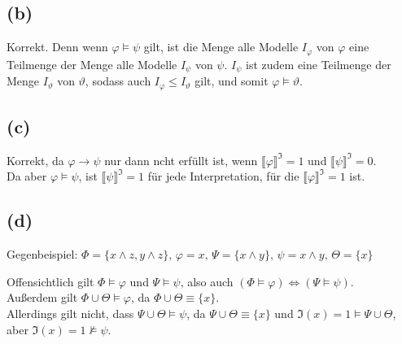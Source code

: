 \documentclass[11pt, a4paper]{article}
\newcommand{\n}{\wedge}
\newcommand{\nmodels}{\nvDash}
\begin{document}
\subsection*{(b)}
Korrekt. Denn wenn $\varphi \models \psi$ gilt, ist die Menge alle Modelle $I_\varphi$ von $\varphi$ eine Teilmenge der Menge alle Modelle $I_\psi$ von $\psi$.
$I_\psi$ ist zudem eine Teilmenge der Menge $I_\vartheta$ von $\vartheta$, sodass auch $I_\varphi \leq I_\vartheta$ gilt, und somit $\varphi \models \vartheta$.

\subsection*{(c)}
Korrekt, da $\varphi \rightarrow \psi$ nur dann ncht erfüllt ist, wenn $\llbracket \varphi \rrbracket^{\mathfrak{I}}=1$ und $\llbracket \psi \rrbracket^{\mathfrak{I}}=0$.\\
Da aber $\varphi \models \psi$, ist $\llbracket \psi \rrbracket^{\mathfrak{I}}=1$ für jede Interpretation, für die $\llbracket \varphi \rrbracket^{\mathfrak{I}}=1$ ist.

\subsection*{(d)}
Gegenbeispiel:
$\Phi = \{ x \n z, y \n z \},\, \varphi = x,\, \Psi = \{ x \n y \},\, \psi = x \n y,\, \Theta = \{ x \}$

Offensichtlich gilt $\Phi \models \varphi$ und $\Psi \models \psi$, also auch $(\Phi \models \varphi) \iff (\Psi \models \psi)$.\\
Außerdem gilt $\Phi \cup \Theta \models \varphi$, da $\Phi \cup \Theta \equiv \{ x \}$.\\
Allerdings gilt nicht, dass $\Psi \cup \Theta \models \psi$, da $\Psi \cup \Theta \equiv \{ x \}$ und $\mathfrak{I}(x)=1 \models \Psi \cup \Theta$, aber $\mathfrak{I}(x)=1 \nmodels \psi$.
\end{document}
